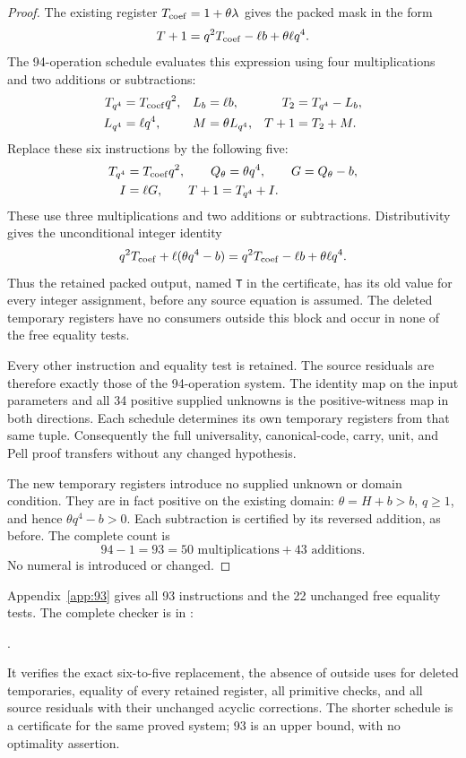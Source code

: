 \begin{proof}
The existing register $T_{\rm coef}=1+\theta\lambda$ gives
the packed mask in the form
\[
 T+1=q^2T_{\rm coef}-\ell b+\theta\ell q^4.
\]
The 94-operation schedule evaluates this expression using four
multiplications and two additions or subtractions:
\[
 \begin{aligned}
 T_{q^4}&=T_{\rm coef}q^2,&
 L_b&=\ell b,& T_2&=T_{q^4}-L_b,\\
 L_{q^4}&=\ell q^4,&
 M&=\theta L_{q^4},& T+1&=T_2+M.
 \end{aligned}
\]
Replace these six instructions by the following five:
\begin{equation}\label{eq:factored-mask-five}
 \begin{aligned}
 T_{q^4}&=T_{\rm coef}q^2,\qquad
 Q_\theta=\theta q^4,\qquad G=Q_\theta-b,\\
 I&=\ell G,\qquad T+1=T_{q^4}+I.
 \end{aligned}
\end{equation}
These use three multiplications and two additions or subtractions.
Distributivity gives the unconditional integer identity
\begin{equation}\label{eq:factored-mask-identity}
 q^2T_{\rm coef}+\ell(\theta q^4-b)
   =q^2T_{\rm coef}-\ell b+\theta\ell q^4.
\end{equation}
Thus the retained packed output, named \texttt{T} in the
certificate, has its old value for every integer assignment,
before any source equation is assumed. The deleted temporary
registers have no consumers outside this block and occur in
none of the free equality tests.

Every other instruction and equality test is retained. The
source residuals are therefore exactly those of the 94-operation
system. The identity map on the input parameters and all 34
positive supplied unknowns is the positive-witness map in both
directions. Each schedule determines its own temporary registers
from that same tuple. Consequently the full universality,
canonical-code, carry, unit, and Pell proof transfers without
any changed hypothesis.

The new temporary registers introduce no supplied unknown or
domain condition. They are in fact positive on the existing
domain: $\theta=H+b>b$, $q\ge1$, and hence
$\theta q^4-b>0$. Each subtraction is certified by its
reversed addition, as before. The complete count is
\[
 94-1=93=50\text{ multiplications}+43\text{ additions}.
\]
No numeral is introduced or changed.
\end{proof}

Appendix~\ref{app:93} gives all 93 instructions and the 22
unchanged free equality tests. The complete checker is in
:
\begin{center}
\small{}.
\end{center}
It verifies the exact six-to-five replacement, the absence of
outside uses for deleted temporaries, equality of every retained
register, all primitive checks, and all source residuals with
their unchanged acyclic corrections. The shorter schedule is
a certificate for the same proved system; 93 is an upper bound,
with no optimality assertion.

